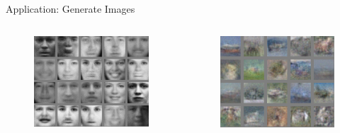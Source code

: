 \begin{frame}[allowframebreaks]{Application: Generate Images}
    \begin{columns}
            \begin{figure}
                \centering
                \includegraphics[width=1\textwidth]{images/dul/slide_21_1_img.png}
            \end{figure}
            \begin{figure}
                \centering
                \includegraphics[width=1\textwidth]{images/dul/slide_21_2_img.png}
            \end{figure}
    \end{columns}
    \vspace{1em}

\end{frame}


